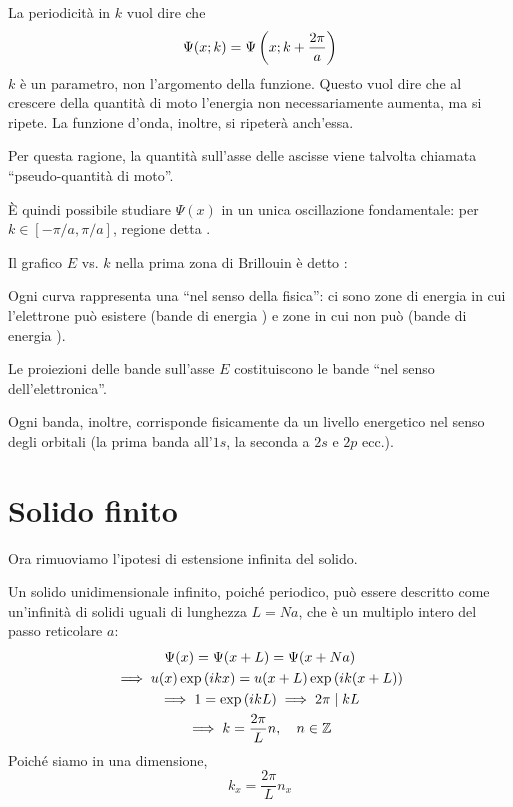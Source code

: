 La periodicità in $k$ vuol dire che
\begin{equation}
    \Psi(x; k) = \Psi\left( x; k + \frac{2\pi}{a} \right)
\end{equation}
$k$ è un parametro, non l'argomento della funzione.
Questo vuol dire che al crescere della quantità di moto l'energia non necessariamente aumenta, ma si ripete.
La funzione d'onda, inoltre, si ripeterà anch'essa.

Per questa ragione, la quantità sull'asse delle ascisse viene talvolta chiamata ``pseudo-quantità di moto''.

È quindi possibile studiare $\Psi(x)$ in un unica oscillazione fondamentale: per $k \in [-\pi / a, \pi / a]$, regione detta .

Il grafico $E$ vs. $k$ nella prima zona di Brillouin è detto :


Ogni curva rappresenta una  ``nel senso della fisica'': ci sono zone di energia in cui l'elettrone può esistere (bande di energia ) e zone in cui non può (bande di energia ).

Le proiezioni delle bande sull'asse $E$ costituiscono le bande ``nel senso dell'elettronica''.

Ogni banda, inoltre, corrisponde fisicamente da un livello energetico nel senso degli orbitali (la prima banda all'$1s$, la seconda a $2s$ e $2p$ ecc.).

\section{Solido finito}

Ora rimuoviamo l'ipotesi di estensione infinita del solido.

Un solido unidimensionale infinito, poiché periodico, può essere descritto come un'infinità di solidi uguali di lunghezza $L = N a$, che è un multiplo intero del passo reticolare $a$:
\begin{gather}
    \Psi(x) = \Psi(x + L) = \Psi(x + N a) \\
    \implies u(x) \operatorname{exp}\left( i k x \right) = u(x + L) \operatorname{exp}\left( i k (x + L) \right) \\
    \implies 1 = \operatorname{exp}\left( i k L \right) \implies 2\pi \mid k L \\
    \implies k = \frac{2\pi}{L} n, \quad n \in \mathbb{Z}
\end{gather}
Poiché siamo in una dimensione,
\begin{equation}
    k_x = \frac{2\pi}{L} n_x
\end{equation}

